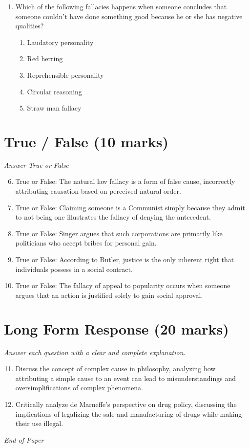\documentclass[12pt]{article}
\begin{document}
\begin{enumerate}[label=\arabic*.]
\begin{enumerate}[label=(\alph*)]
    \item retaliatory
    \item punitive
    \item compensatory
\end{enumerate}
\item Which of the following fallacies happens when someone concludes that someone couldn't have done something good because he or she has negative qualities?
\begin{enumerate}[label=(\alph*)]
    \item Laudatory personality
    \item Red herring
    \item Reprehensible personality
    \item Circular reasoning
    \item Straw man fallacy
\end{enumerate}
\end{enumerate}

\section*{True / False (10 marks)}
\textit{Answer True or False}
\begin{enumerate}[label=\arabic*.]
\setcounter{enumi}{5}
\item True or False: The natural law fallacy is a form of false cause, incorrectly attributing causation based on perceived natural order.
\item True or False: Claiming someone is a Communist simply because they admit to not being one illustrates the fallacy of denying the antecedent.
\item True or False: Singer argues that such corporations are primarily like politicians who accept bribes for personal gain.
\item True or False: According to Butler, justice is the only inherent right that individuals possess in a social contract.
\item True or False: The fallacy of appeal to popularity occurs when someone argues that an action is justified solely to gain social approval.
\end{enumerate}

\section*{Long Form Response (20 marks)}
\textit{Answer each question with a clear and complete explanation.}
\begin{enumerate}[label=\arabic*.]
\setcounter{enumi}{10}
\item Discuss the concept of complex cause in philosophy, analyzing how attributing a simple cause to an event can lead to misunderstandings and oversimplifications of complex phenomena.
\item Critically analyze de Marneffe's perspective on drug policy, discussing the implications of legalizing the sale and manufacturing of drugs while making their use illegal.
\end{enumerate}

\vfill
\noindent\textit{End of Paper}
\end{document}
